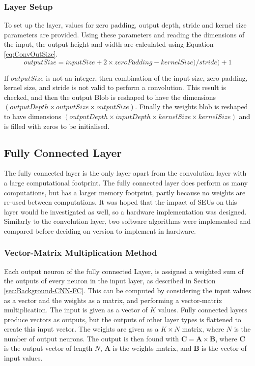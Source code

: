 \documentclass[12pt]{article}
\begin{document}
\subsubsection{Layer Setup}
\label{sec:Design-Conv-Setup}

To set up the layer, values for zero padding, output depth, stride and kernel size parameters are provided. Using these parameters and reading the dimensions of the input, the output height and width are calculated using Equation \ref{eq:ConvOutSize}.
\begin{equation}
outputSize = inputSize + 2 \times zeroPadding - kernelSize) / stride) + 1
\label{eq:ConvOutSize}
\end{equation}

If $outputSize$ is not an integer, then combination of the input size, zero padding, kernel size, and stride is not valid to perform a convolution. This result is checked, and then the output Blob is reshaped to have the dimensions $(outputDepth \times outputSize \times outputSize)$. Finally the weights blob is reshaped to have dimensions $(outputDepth \times inputDepth \times kernelSize \times kernelSize)$ and is filled with zeros to be initialised.

\subsection{Fully Connected Layer}
\label{sec:Design-FC}

The fully connected layer is the only layer apart from the convolution layer with a large computational footprint. The fully connected layer does	 perform as many computations, but has a larger memory footprint, partly because no weights are re-used between computations. It was hoped that the impact of SEUs on this layer would be investigated as well, so a hardware implementation was designed. Similarly to the convolution layer, two software algorithms were implemented and compared before deciding on  version to implement in hardware. 

\subsubsection{Vector-Matrix Multiplication Method}
\label{sec:Design-FC-MM}

Each output neuron of the fully connected Layer, is assigned a weighted sum of the outputs of every neuron in the input layer, as described in Section \ref{sec:Background-CNN-FC}. This can be computed by considering the input values as a vector and the weights as a matrix, and performing a vector-matrix multiplication. The input is given as a vector of $K$ values. Fully connected layers produce vectors as outputs, but the outputs of other layer types is flattened to create this input vector. The weights are given as a $K \times N$ matrix, where $N$ is the number of output neurons. The output is then found with \( \mathbf{C} = \mathbf{A}\times\mathbf{B}\), where $\mathbf{C}$ is the output vector of length $N$, $\mathbf{A}$ is the weights matrix, and $\mathbf{B}$ is the vector  of input values. 
\end{document}
